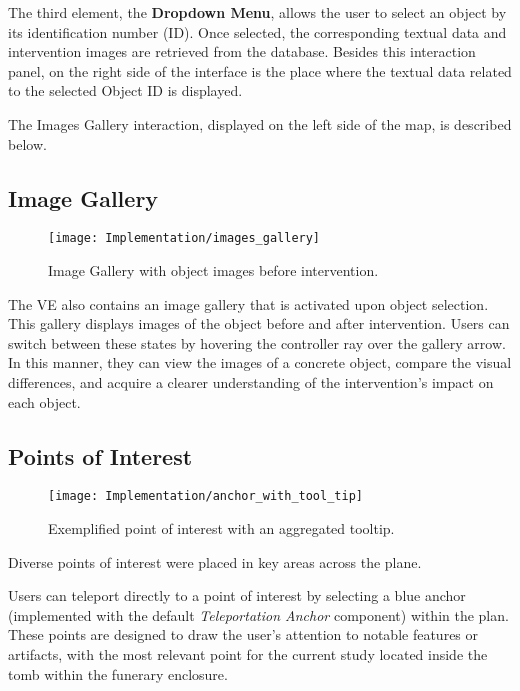 The third element, the \textbf{Dropdown Menu}, allows the user to select an object by its identification number (ID).
Once selected, the corresponding textual data and intervention images are retrieved from the database.
Besides this interaction panel, on the right side of the interface is the place where the textual data related to the selected Object ID is displayed.

The Images Gallery interaction, displayed on the left side of the map, is described below.

\subsection*{Image Gallery}
\label{sec:image_gallery}

\begin{figure}[h!]
    \centering
    \texttt{[image: Implementation/images\_gallery]}
    \caption{Image Gallery with object images before intervention.}
    \label{fig:image_gallery}
\end{figure}

The \gls{VE} also contains an image gallery that is activated upon object selection. 
This gallery displays images of the object before and after intervention. 
Users can switch between these states by hovering the controller ray over the gallery arrow. 
In this manner, they can view the images of a concrete object, compare the visual differences, and acquire a clearer understanding of the intervention's impact on each object.

\subsection*{Points of Interest}
\label{sec:points_interest}

\begin{figure}[h!]
    \centering
    \texttt{[image: Implementation/anchor\_with\_tool\_tip]}
    \caption{Exemplified point of interest with an aggregated tooltip.}
    \label{fig:points_interest}
\end{figure}

Diverse points of interest were placed in key areas across the plane.

Users can teleport directly to a point of interest by selecting a blue anchor (implemented with the default \emph{Teleportation Anchor} component) within the plan. These points are designed to draw the user’s attention to notable features or artifacts, with the most relevant point for the current study located inside the tomb within the funerary enclosure.

